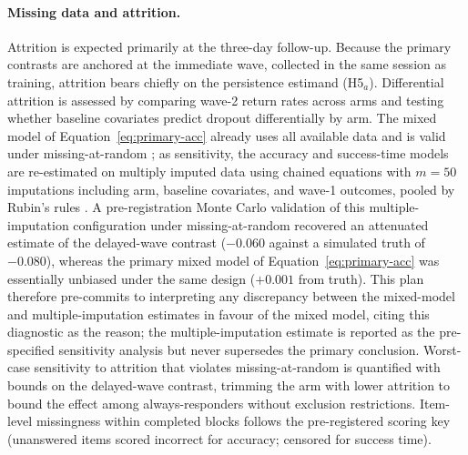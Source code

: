 \paragraph{Missing data and attrition.}
Attrition is expected primarily at the three-day follow-up. Because the primary contrasts are anchored at the immediate wave, collected in the same session as training, attrition bears chiefly on the persistence estimand (H5$_a$). Differential attrition is assessed by comparing wave-2 return rates across arms and testing whether baseline covariates predict dropout differentially by arm. The mixed model of Equation~\eqref{eq:primary-acc} already uses all available data and is valid under missing-at-random \parencite{detry2016}; %
as sensitivity, the accuracy and success-time models are re-estimated on multiply imputed data using chained equations with $m = 50$ imputations including arm, baseline covariates, and wave-1 outcomes, pooled by Rubin's rules \parencite{white2011}. %
A pre-registration Monte Carlo validation of this multiple-imputation configuration under missing-at-random recovered an attenuated estimate of the delayed-wave contrast ($-0.060$ against a simulated truth of $-0.080$), whereas the primary mixed model of Equation~\eqref{eq:primary-acc} was essentially unbiased under the same design ($+0.001$ from truth). This plan therefore pre-commits to interpreting any discrepancy between the mixed-model and multiple-imputation estimates in favour of the mixed model, citing this diagnostic as the reason; the multiple-imputation estimate is reported as the pre-specified sensitivity analysis but never supersedes the primary conclusion.
Worst-case sensitivity to attrition that violates missing-at-random is quantified with \textcite{lee2009} bounds on the delayed-wave contrast, %
trimming the arm with lower attrition to bound the effect among always-responders without exclusion restrictions. Item-level missingness within completed blocks follows the pre-registered scoring key (unanswered items scored incorrect for accuracy; censored for success time).

